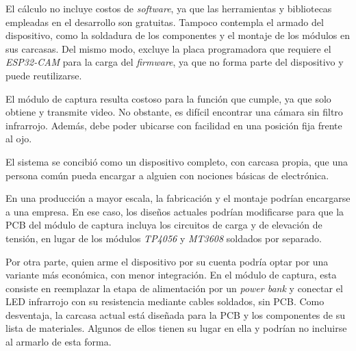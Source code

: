 El cálculo no incluye costos de \emph{software}, ya que las herramientas y bibliotecas empleadas en el desarrollo son gratuitas. Tampoco contempla el armado del dispositivo, como la soldadura de los componentes y el montaje de los módulos en sus carcasas. Del mismo modo, excluye la placa programadora que requiere el \emph{ESP32-CAM} para la carga del \emph{firmware}, ya que no forma parte del dispositivo y puede reutilizarse.

El módulo de captura resulta costoso para la función que cumple, ya que solo obtiene y transmite video. No obstante, es difícil encontrar una cámara sin filtro infrarrojo. Además, debe poder ubicarse con facilidad en una posición fija frente al ojo.

El sistema se concibió como un dispositivo completo, con carcasa propia, que una persona común pueda encargar a alguien con nociones básicas de electrónica.

En una producción a mayor escala, la fabricación y el montaje podrían encargarse a una empresa. En ese caso, los diseños actuales podrían modificarse para que la PCB del módulo de captura incluya los circuitos de carga y de elevación de tensión, en lugar de los módulos \emph{TP4056} y \emph{MT3608} soldados por separado.

Por otra parte, quien arme el dispositivo por su cuenta podría optar por una variante más económica, con menor integración. En el módulo de captura, esta consiste en reemplazar la etapa de alimentación por un \emph{power bank} y conectar el LED infrarrojo con su resistencia mediante cables soldados, sin PCB. Como desventaja, la carcasa actual está diseñada para la PCB y los componentes de su lista de materiales. Algunos de ellos tienen su lugar en ella y podrían no incluirse al armarlo de esta forma.